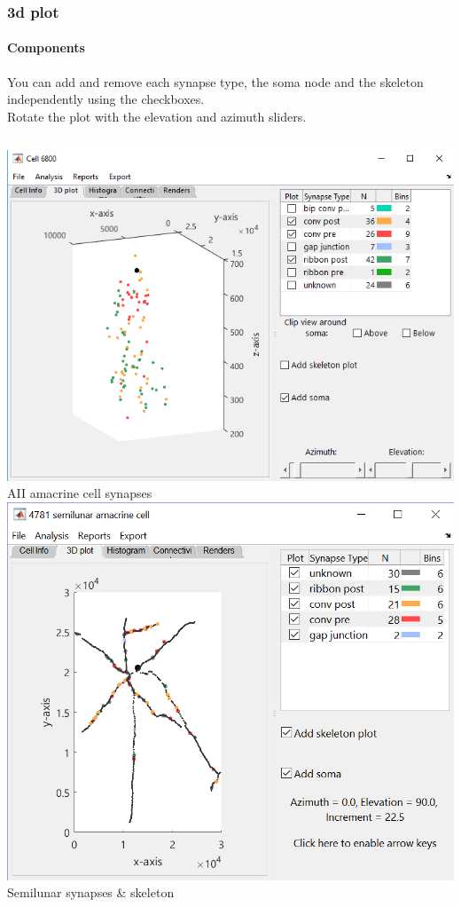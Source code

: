 \documentclass[11pt]{beamer}
\begin{document}
\begin{frame}
	\frametitle{3d plot}
	\framesubtitle{Components}
		You can add and remove each synapse type, the soma node and the skeleton independently using the checkboxes.\\Rotate the plot with the elevation and azimuth sliders.
		\vskip20pt
		\begin{columns}
				\includegraphics[width=\textwidth]{c6800_plot3}
				\vskip5pt
				AII amacrine cell synapses
				\includegraphics[width=\textwidth]{c4781_plot3}
				\vskip5pt
				Semilunar synapses \& skeleton
		\end{columns}
\end{frame}
\end{document}
